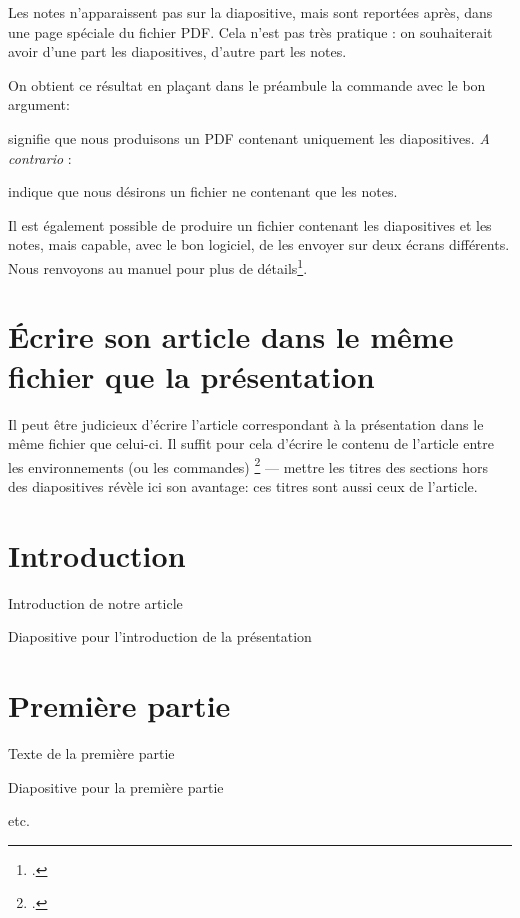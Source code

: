 Les notes n'apparaissent pas sur la diapositive, mais sont reportées après, dans une page spéciale du fichier PDF. Cela n'est pas très pratique : on souhaiterait avoir d'une part les diapositives, d'autre part les notes. 

On obtient ce résultat en plaçant dans le préambule la commande  avec le bon argument:

\begin{latexcode}
\end{latexcode}

signifie que nous produisons un PDF contenant uniquement les diapositives. \emph{A contrario} :

\begin{latexcode}
\end{latexcode}

indique que nous désirons un fichier ne contenant que les notes.

Il est également possible de produire un fichier contenant les diapositives et les notes, mais capable, avec le bon logiciel, de les envoyer sur deux écrans différents. Nous renvoyons au manuel pour plus de détails\footcite{beamer_2ecrans}.

\section{Écrire son article dans le même fichier que la présentation}

Il peut être judicieux d'écrire l'article correspondant à la présentation dans le même fichier que celui-ci. Il suffit pour cela d'écrire le contenu de l'article entre les environnements (ou les commandes) \footcites[À noter qu'on peut aussi introduire des miniatures des diapositives  dans l'article, voir :][]{beamer_diapo_article} ---  mettre les titres des sections hors des diapositives révèle ici son avantage: ces titres sont aussi ceux de l'article.

\begin{latexcode}
\section{Introduction}

Introduction de notre article
\begin{frame}
    Diapositive pour l'introduction de la présentation
\end{frame}

\section{Première partie}

Texte de la première partie
\begin{frame}
    Diapositive pour la première partie
\end{frame}

etc.
\end{latexcode}

